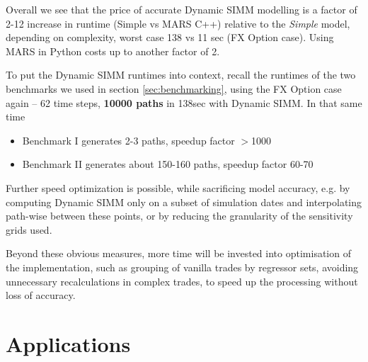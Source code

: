 \documentclass[11pt,a4paper,oneside]{article}
\begin{document}
Overall we see that the price of accurate Dynamic SIMM modelling is a factor of 2-12 increase in runtime (Simple vs MARS C++) relative to the {\em Simple} model,
depending on complexity, worst case 138 vs 11 sec (FX Option case). Using MARS in Python costs up to another factor of 2.

To put the Dynamic SIMM runtimes into context, recall the runtimes of the two benchmarks we used in section \ref{sec:benchmarking}, using the FX Option
case again -- 62 time steps, {\bf 10000 paths} in 138sec with Dynamic SIMM. In that same time 
\begin{itemize}
\item Benchmark I generates 2-3 paths, speedup factor $>$1000
\item Benchmark II generates about 150-160 paths, speedup factor 60-70
\end{itemize}
Further speed optimization is possible, while sacrificing model accuracy, e.g. by computing Dynamic SIMM only on a subset of simulation dates and interpolating
path-wise between these points, or by reducing the granularity of the sensitivity grids used.

\noindent
Beyond these obvious measures, more time will be invested into optimisation of the implementation, such as grouping of vanilla trades by regressor sets, avoiding
unnecessary recalculations in complex trades, to speed up the processing without loss of accuracy.

\section{Applications} \label{sec:applications}
\end{document}
